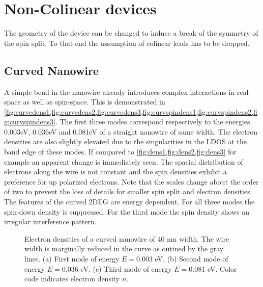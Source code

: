 \section{Non-Colinear devices}
The geometry of the device can be changed to induce a break of the symmetry of the spin split. To that end the assumption of colinear leads has to be dropped.
\subsection{Curved Nanowire}
A simple bend in the nanowire already introduces complex interactions in real-space as well as spin-space. This is demonstrated in \cref{fig:curvedens1,fig:curvedens2,fig:curvedens3,fig:curvspindens1,fig:curvspindens2,fig:curvspindens3}. The first three modes correspond respectively to the energies 0.003eV, 0.036eV and 0.081eV of a straight nanowire of same width. The electron densities are also slightly elevated due to the singularities in the LDOS at the band edge of these modes. If compared to \cref{fig:dens1,fig:dens2,fig:dens3} for example an apparent change is immediately seen. The spacial distribution of electrons along the wire is not constant and the spin densities exhibit a preference for up polarized electrons. Note that the scales change about the order of two to prevent the loss of details for smaller spin split and electron densities. The features of the curved 2DEG are energy dependent. For all three modes the spin-down density is suppressed. For the third mode the spin density shows an irregular interference pattern.\par
\begin{figure}[h!]
\caption{Electron densities of a curved nanowire of 40 nm width. The wire width is marginally reduced in the curve as outined by the gray lines. (a) First mode of energy $E=0.003$ eV. (b) Second mode of energy $E=0.036$ eV. (c) Third mode of energy $E=0.081$ eV. Color code indicates electron density $n$.}
\end{figure}
